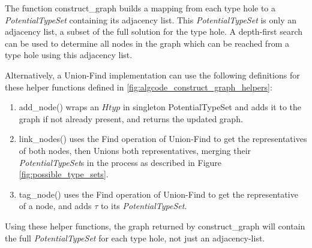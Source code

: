 
The function construct\_graph builds a mapping from each type hole to a \emph{PotentialTypeSet} containing its adjacency list. This \textit{PotentialTypeSet} is only an adjacency list, a subset of the full solution for the type hole. A depth-first search can be used to determine all nodes in the graph which can be reached from a type hole using this adjacency list.

Alternatively, a Union-Find implementation can use the following definitions for these helper functions defined in \ref{fig:algcode_construct_graph_helpers}:
\begin{enumerate}
  \item add\_node() wraps an $Htyp$ in singleton PotentialTypeSet and adds it to the graph if not already present, and returns the updated graph.
  \item link\_nodes() uses the Find operation of Union-Find to get the representatives of both nodes, then Unions both representatives, merging their \textit{PotentialTypeSet}s in the process as described in Figure \ref{fig:possible_type_sets}.
  \item tag\_node() uses the Find operation of Union-Find to get the representative of a node, and adds $\tau$ to its \textit{PotentialTypeSet}.
\end{enumerate}
Using these helper functions, the graph returned by construct\_graph will contain the full \textit{PotentialTypeSet} for each type hole, not just an adjacency-list.

